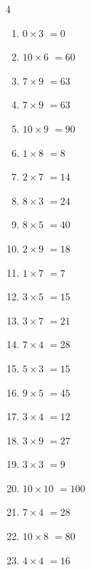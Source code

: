 \begin{multicols}{4}
\begin{enumerate}
  \item $0\times 3$
        $=0$

  \item $10\times 6$
        $=60$

  \item $7\times 9$
        $=63$

  \item $7\times 9$
        $=63$

  \item $10\times 9$
        $=90$

  \item $1\times 8$
        $=8$

  \item $2\times 7$
        $=14$

  \item $8\times 3$
        $=24$

  \item $8\times 5$
        $=40$

  \item $2\times 9$
        $=18$

  \item $1\times 7$
        $=7$

  \item $3\times 5$
        $=15$

  \item $3\times 7$
        $=21$

  \item $7\times 4$
        $=28$

  \item $5\times 3$
        $=15$

  \item $9\times 5$
        $=45$

  \item $3\times 4$
        $=12$

  \item $3\times 9$
        $=27$

  \item $3\times 3$
        $=9$

  \item $10\times 10$
        $=100$

  \item $7\times 4$
        $=28$

  \item $10\times 8$
        $=80$

  \item $4\times 4$
        $=16$


\end{enumerate}
\end{multicols}
